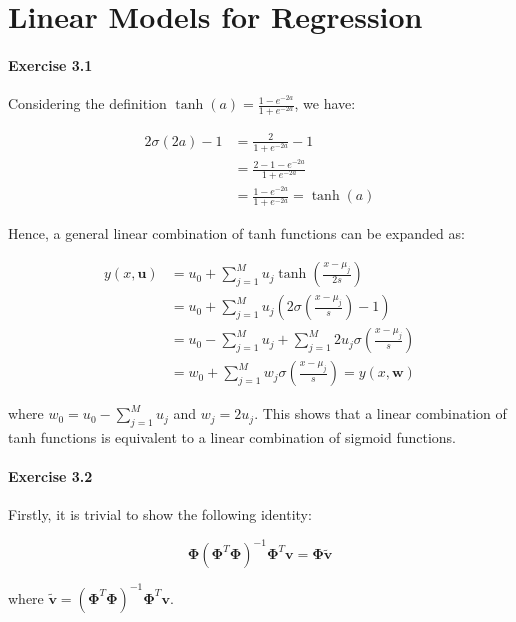 \section{Linear Models for Regression}

\paragraph{Exercise 3.1}

Considering the definition $\tanh(a) = \frac{1 - e^{-2a}}{1 + e^{-2a}}$, we have:

\begin{align*}
    2\sigma(2a) - 1 &= \frac{2}{1 + e^{-2a}} - 1 \\
    &= \frac{2 - 1 - e^{-2a}}{1 + e^{-2a}} \\
    &= \frac{1 - e^{-2a}}{1 + e^{-2a}} = \tanh(a)
\end{align*}

Hence, a general linear combination of tanh functions can be expanded as:

\begin{align*}
    y(x, \mathbf{u}) &= u_0 + \sum_{j = 1}^{M} u_j \tanh(\frac{x - \mu_j}{2s}) \\
    &= u_0 + \sum_{j = 1}^{M} u_j (2\sigma(\frac{x - \mu_j}{s}) - 1) \\
    &= u_0 - \sum_{j = 1}^{M} u_j + \sum_{j = 1}^{M} 2u_j \sigma(\frac{x - \mu_j}{s}) \\
    &= w_0 + \sum_{j = 1}^{M} w_j \sigma(\frac{x - \mu_j}{s}) = y(x, \mathbf{w})
\end{align*}

where $w_0 = u_0 - \sum_{j = 1}^{M} u_j$ and $w_j = 2u_j$. This shows that a linear combination of tanh functions is equivalent to a linear combination of sigmoid functions.

\paragraph{Exercise 3.2}

Firstly, it is trivial to show the following identity:

\begin{equation*}
    \mathbf{\Phi}(\mathbf{\Phi}^T\mathbf{\Phi})^{-1}\mathbf{\Phi}^T \mathbf{v} = \mathbf{\Phi} \mathbf{\tilde{v}}    
\end{equation*}

where $\mathbf{\tilde{v}} = (\mathbf{\Phi}^T\mathbf{\Phi})^{-1}\mathbf{\Phi}^T \mathbf{v}$.

